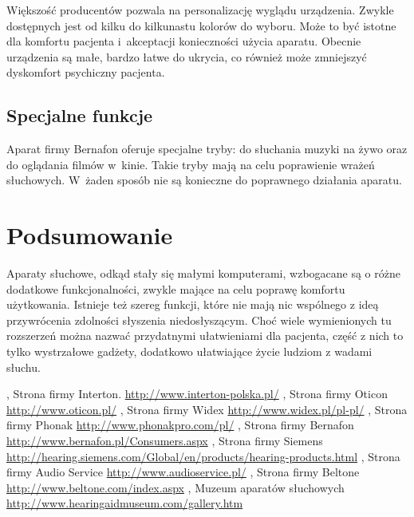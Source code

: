 \documentclass[journal,11pt]{IEEEtran}
\begin{document}
Większość producentów pozwala na personalizację wyglądu urządzenia. Zwykle
dostępnych jest od kilku do kilkunastu kolorów do wyboru. Może to być istotne
dla komfortu pacjenta i~akceptacji konieczności użycia aparatu. Obecnie
urządzenia są małe, bardzo łatwe do ukrycia, co również może zmniejszyć
dyskomfort psychiczny pacjenta.

\subsection{Specjalne funkcje}

Aparat firmy Bernafon oferuje specjalne tryby: do słuchania muzyki na żywo oraz
do oglądania filmów w~kinie. Takie tryby mają na celu poprawienie wrażeń
słuchowych. W~żaden sposób nie są konieczne do poprawnego działania aparatu. 

\section{Podsumowanie}

Aparaty słuchowe, odkąd stały się małymi komputerami, wzbogacane są o różne
dodatkowe funkcjonalności, zwykle mające na celu poprawę komfortu użytkowania.
Istnieje też szereg funkcji, które nie mają nic wspólnego z ideą przywrócenia
zdolności słyszenia niedosłyszącym. Choć wiele wymienionych tu rozszerzeń można
nazwać przydatnymi ułatwieniami dla pacjenta, część z nich to tylko wystrzałowe
gadżety, dodatkowo ułatwiające życie ludziom z wadami słuchu.

\begin{thebibliography}{123}
    , Strona firmy Interton.
        \url{http://www.interton-polska.pl/}
    , Strona firmy Oticon
        \url{http://www.oticon.pl/}
    , Strona firmy Widex
        \url{http://www.widex.pl/pl-pl/}
    , Strona firmy Phonak
        \url{http://www.phonakpro.com/pl/}
    , Strona firmy Bernafon
        \url{http://www.bernafon.pl/Consumers.aspx}
    , Strona firmy Siemens
        \url{http://hearing.siemens.com/Global/en/products/hearing-products.html}
    , Strona firmy Audio Service
        \url{http://www.audioservice.pl/}
    , Strona firmy Beltone
        \url{http://www.beltone.com/index.aspx}
    , Muzeum aparatów słuchowych
        \url{http://www.hearingaidmuseum.com/gallery.htm}
\end{thebibliography}
\end{document}
